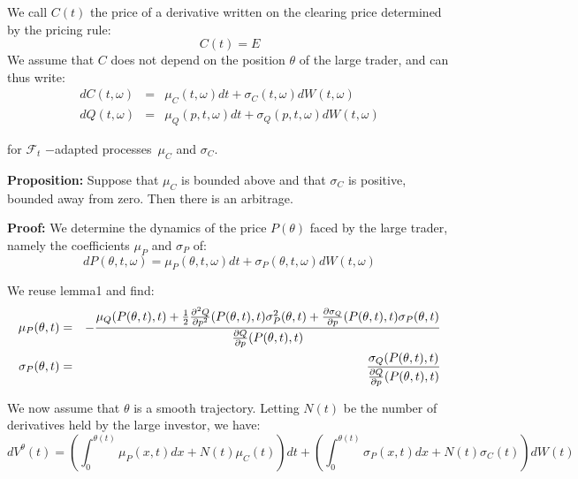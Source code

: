 \documentclass{article}
\begin{document}
\bigskip

We call $C(t)$ the price of a derivative written on the clearing price
determined by the pricing rule:%
\begin{equation*}
C(t)=E
\end{equation*}
We assume that $C$ does not depend on the position $\theta $ of the large
trader, and can thus write:%
\begin{eqnarray*}
dC(t,\omega ) &=&\mu _{C}(t,\omega )dt+\sigma _{C}(t,\omega )dW(t,\omega ) \\
dQ(t,\omega ) &=&\mu _{Q}(p,t,\omega )dt+\sigma _{Q}(p,t,\omega )dW(t,\omega
)
\end{eqnarray*}%
\bigskip

for $\mathcal{F}_{t}$ $-$adapted processes\ $\mu _{C}$ and $\sigma _{C}$.

\bigskip

\textbf{Proposition:} Suppose that $\mu _{C}$ is bounded above and that $%
\sigma _{C}$ is positive, bounded away from zero. Then there is an arbitrage.

\bigskip

\textbf{Proof:} We determine the dynamics of the price $P(\theta )$ faced by
the large trader, namely the coefficients $\mu _{P}$ and $\sigma _{P}$ of:%
\begin{equation*}
dP(\theta ,t,\omega )=\mu _{P}(\theta ,t,\omega )dt+\sigma _{P}(\theta
,t,\omega )dW(t,\omega )
\end{equation*}

We reuse lemma1 and find:%
\begin{eqnarray*}
\mu _{P}(\theta ,t) &=&-\frac{\mu _{Q}(P(\theta ,t),t)+\frac{1}{2}\frac{%
\partial ^{2}Q}{\partial p^{2}}(P(\theta ,t),t)\sigma _{P}^{2}(\theta ,t)+%
\frac{\partial \sigma _{Q}}{\partial p}(P(\theta ,t),t)\sigma _{P}(\theta ,t)%
}{\frac{\partial Q}{\partial p}(P(\theta ,t),t)} \\
\sigma _{P}(\theta ,t) &=&\frac{\sigma _{Q}(P(\theta ,t),t)}{\frac{\partial Q%
}{\partial p}(P(\theta ,t),t)}
\end{eqnarray*}

We now assume that $\theta $ is a smooth trajectory. Letting $N(t)$ be the
number of derivatives held by the large investor, we have:%
\begin{equation*}
dV^{\theta }(t)=\left( \int_{0}^{\theta (t)}\mu _{P}(x,t)dx+N(t)\mu
_{C}(t)\right) dt+\left( \int_{0}^{\theta (t)}\sigma _{P}(x,t)dx+N(t)\sigma
_{C}(t)\right) dW(t)
\end{equation*}
\end{document}
